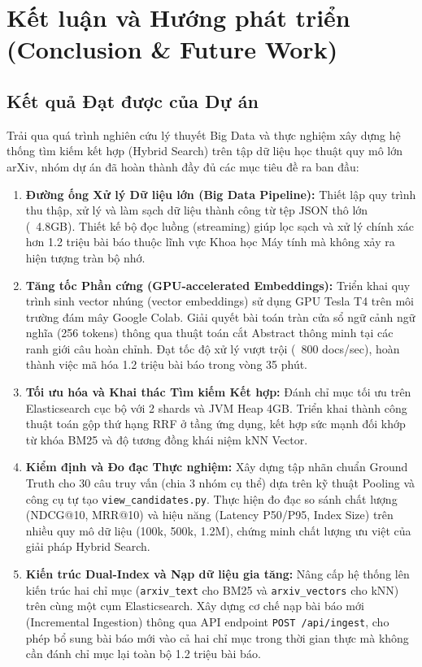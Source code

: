 \chapter{Kết luận và Hướng phát triển (Conclusion \& Future Work)}
\label{ch:conclusion}

\section{Kết quả Đạt được của Dự án}
Trải qua quá trình nghiên cứu lý thuyết Big Data và thực nghiệm xây dựng hệ thống tìm kiếm kết hợp (Hybrid Search) trên tập dữ liệu học thuật quy mô lớn arXiv, nhóm dự án đã hoàn thành đầy đủ các mục tiêu đề ra ban đầu:
\begin{enumerate}
    \item \textbf{Đường ống Xử lý Dữ liệu lớn (Big Data Pipeline):} Thiết lập quy trình thu thập, xử lý và làm sạch dữ liệu thành công từ tệp JSON thô lớn (~4.8GB). Thiết kế bộ đọc luồng (streaming) giúp lọc sạch và xử lý chính xác hơn 1.2 triệu bài báo thuộc lĩnh vực Khoa học Máy tính mà không xảy ra hiện tượng tràn bộ nhớ.
    \item \textbf{Tăng tốc Phần cứng (GPU-accelerated Embeddings):} Triển khai quy trình sinh vector nhúng (vector embeddings) sử dụng GPU Tesla T4 trên môi trường đám mây Google Colab. Giải quyết bài toán tràn cửa sổ ngữ cảnh ngữ nghĩa (256 tokens) thông qua thuật toán cắt Abstract thông minh tại các ranh giới câu hoàn chỉnh. Đạt tốc độ xử lý vượt trội (~800 docs/sec), hoàn thành việc mã hóa 1.2 triệu bài báo trong vòng 35 phút.
    \item \textbf{Tối ưu hóa và Khai thác Tìm kiếm Kết hợp:} Đánh chỉ mục tối ưu trên Elasticsearch cục bộ với 2 shards và JVM Heap 4GB. Triển khai thành công thuật toán gộp thứ hạng RRF ở tầng ứng dụng, kết hợp sức mạnh đối khớp từ khóa BM25 và độ tương đồng khái niệm kNN Vector.
    \item \textbf{Kiểm định và Đo đạc Thực nghiệm:} Xây dựng tập nhãn chuẩn Ground Truth cho 30 câu truy vấn (chia 3 nhóm cụ thể) dựa trên kỹ thuật Pooling và công cụ tự tạo \texttt{view\_candidates.py}. Thực hiện đo đạc so sánh chất lượng (NDCG@10, MRR@10) và hiệu năng (Latency P50/P95, Index Size) trên nhiều quy mô dữ liệu (100k, 500k, 1.2M), chứng minh chất lượng ưu việt của giải pháp Hybrid Search.
    \item \textbf{Kiến trúc Dual-Index và Nạp dữ liệu gia tăng:} Nâng cấp hệ thống lên kiến trúc hai chỉ mục (\texttt{arxiv\_text} cho BM25 và \texttt{arxiv\_vectors} cho kNN) trên cùng một cụm Elasticsearch. Xây dựng cơ chế nạp bài báo mới (Incremental Ingestion) thông qua API endpoint \texttt{POST /api/ingest}, cho phép bổ sung bài báo mới vào cả hai chỉ mục trong thời gian thực mà không cần đánh chỉ mục lại toàn bộ 1.2 triệu bài báo.
\end{enumerate}

